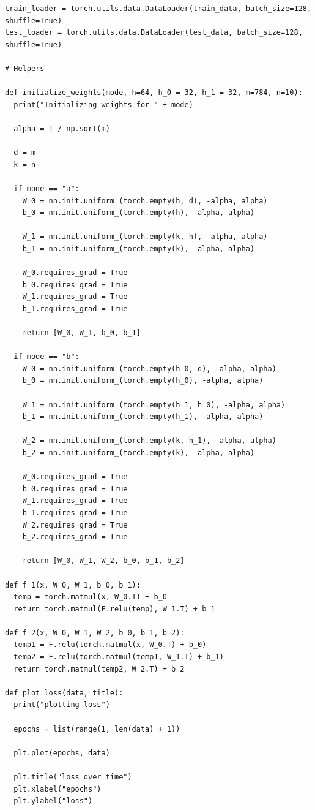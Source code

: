 \documentclass{article}
\newcommand{\1}{\mathbf{1}}
\begin{document}
{\begin{verbatim}
train_loader = torch.utils.data.DataLoader(train_data, batch_size=128, shuffle=True)
test_loader = torch.utils.data.DataLoader(test_data, batch_size=128, shuffle=True)

# Helpers

def initialize_weights(mode, h=64, h_0 = 32, h_1 = 32, m=784, n=10):
  print("Initializing weights for " + mode)
  
  alpha = 1 / np.sqrt(m)
  
  d = m
  k = n
  
  if mode == "a":
    W_0 = nn.init.uniform_(torch.empty(h, d), -alpha, alpha)
    b_0 = nn.init.uniform_(torch.empty(h), -alpha, alpha)
    
    W_1 = nn.init.uniform_(torch.empty(k, h), -alpha, alpha)
    b_1 = nn.init.uniform_(torch.empty(k), -alpha, alpha)
    
    W_0.requires_grad = True
    b_0.requires_grad = True
    W_1.requires_grad = True
    b_1.requires_grad = True
    
    return [W_0, W_1, b_0, b_1]

  if mode == "b":
    W_0 = nn.init.uniform_(torch.empty(h_0, d), -alpha, alpha)    
    b_0 = nn.init.uniform_(torch.empty(h_0), -alpha, alpha)
    
    W_1 = nn.init.uniform_(torch.empty(h_1, h_0), -alpha, alpha)
    b_1 = nn.init.uniform_(torch.empty(h_1), -alpha, alpha)

    W_2 = nn.init.uniform_(torch.empty(k, h_1), -alpha, alpha)
    b_2 = nn.init.uniform_(torch.empty(k), -alpha, alpha)

    W_0.requires_grad = True
    b_0.requires_grad = True
    W_1.requires_grad = True
    b_1.requires_grad = True
    W_2.requires_grad = True
    b_2.requires_grad = True

    return [W_0, W_1, W_2, b_0, b_1, b_2]

def f_1(x, W_0, W_1, b_0, b_1):
  temp = torch.matmul(x, W_0.T) + b_0
  return torch.matmul(F.relu(temp), W_1.T) + b_1

def f_2(x, W_0, W_1, W_2, b_0, b_1, b_2):
  temp1 = F.relu(torch.matmul(x, W_0.T) + b_0)
  temp2 = F.relu(torch.matmul(temp1, W_1.T) + b_1)
  return torch.matmul(temp2, W_2.T) + b_2 

def plot_loss(data, title):
  print("plotting loss")

  epochs = list(range(1, len(data) + 1))

  plt.plot(epochs, data)

  plt.title("loss over time")
  plt.xlabel("epochs")
  plt.ylabel("loss")


\end{verbatim}}
\end{document}
